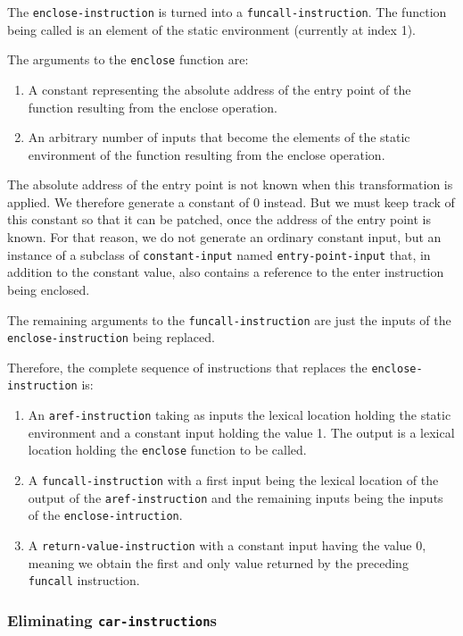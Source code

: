 The \texttt{enclose-instruction} is turned into a
\texttt{funcall-instruction}.  The function being called is an element
of the static environment (currently at index 1).

The arguments to the \texttt{enclose} function are:

\begin{enumerate}
\item A constant representing the absolute address of the entry point
  of the function resulting from the enclose operation.
\item An arbitrary number of inputs that become the elements of the
  static environment of the function resulting from the enclose
  operation.
\end{enumerate}

The absolute address of the entry point is not known when this
transformation is applied.  We therefore generate a constant of 0
instead.  But we must keep track of this constant so that it can be
patched, once the address of the entry point is known.  For that
reason, we do not generate an ordinary constant input, but an instance
of a subclass of \texttt{constant-input} named
\texttt{entry-point-input} that, in addition to the constant value,
also contains a reference to the enter instruction being enclosed.

The remaining arguments to the \texttt{funcall-instruction} are just
the inputs of the \texttt{enclose-instruction} being replaced.

Therefore, the complete sequence of instructions that replaces the
\texttt{enclose-instruction} is:

\begin{enumerate}
\item An \texttt{aref-instruction} taking as inputs the lexical
  location holding the static environment and a constant input holding
  the value 1.  The output is a lexical location holding the
  \texttt{enclose} function to be called.
\item A \texttt{funcall-instruction} with a first input being the
  lexical location of the output of the \texttt{aref-instruction} and
  the remaining inputs being the inputs of the
  \texttt{enclose-intruction}.
\item A \texttt{return-value-instruction} with a constant input having
  the value $0$, meaning we obtain the first and only value returned
  by the preceding \texttt{funcall} instruction.
\end{enumerate}

\subsubsection{Eliminating \texttt{car-instruction}s}

